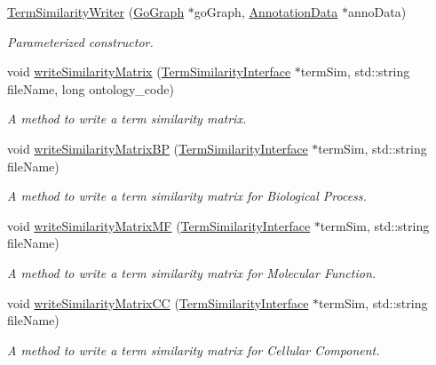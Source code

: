\begin{DoxyCompactItemize}
\item 
\hyperlink{classTermSimilarityWriter_a53dffc62cbc87ba24bc4e10ea0def16c}{Term\+Similarity\+Writer} (\hyperlink{classGoGraph}{Go\+Graph} $\ast$go\+Graph, \hyperlink{classAnnotationData}{Annotation\+Data} $\ast$anno\+Data)
\begin{DoxyCompactList}\small\item\em Parameterized constructor. \end{DoxyCompactList}\item 
void \hyperlink{classTermSimilarityWriter_a6675f612d2f294c2a126576a393b2307}{write\+Similarity\+Matrix} (\hyperlink{classTermSimilarityInterface}{Term\+Similarity\+Interface} $\ast$term\+Sim, std\+::string file\+Name, long ontology\+\_\+code)
\begin{DoxyCompactList}\small\item\em A method to write a term similarity matrix. \end{DoxyCompactList}\item 
void \hyperlink{classTermSimilarityWriter_ab47132660b1a4a2528dff1b97f934b1b}{write\+Similarity\+Matrix\+BP} (\hyperlink{classTermSimilarityInterface}{Term\+Similarity\+Interface} $\ast$term\+Sim, std\+::string file\+Name)
\begin{DoxyCompactList}\small\item\em A method to write a term similarity matrix for Biological Process. \end{DoxyCompactList}\item 
void \hyperlink{classTermSimilarityWriter_ac541f5cb901cece561648acdfa294653}{write\+Similarity\+Matrix\+MF} (\hyperlink{classTermSimilarityInterface}{Term\+Similarity\+Interface} $\ast$term\+Sim, std\+::string file\+Name)
\begin{DoxyCompactList}\small\item\em A method to write a term similarity matrix for Molecular Function. \end{DoxyCompactList}\item 
void \hyperlink{classTermSimilarityWriter_ad021eceaae4427c3e9efea93a63a15ad}{write\+Similarity\+Matrix\+CC} (\hyperlink{classTermSimilarityInterface}{Term\+Similarity\+Interface} $\ast$term\+Sim, std\+::string file\+Name)
\begin{DoxyCompactList}\small\item\em A method to write a term similarity matrix for Cellular Component. \end{DoxyCompactList}\end{DoxyCompactItemize}


